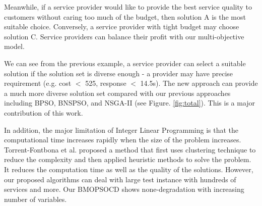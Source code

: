 \documentclass[10pt,journal,compsoc]{IEEEtran}
\begin{document}
Meanwhile, if a service provider would like to provide the best service quality to customers without caring too much of the budget, then solution A is the most suitable choice. Conversely, a service provider with tight budget may choose solution C. 
Service providers can balance their profit with our multi-objective model.

We can see from the previous example, a service provider can select a suitable solution if the solution set is diverse enough - a provider may have precise requirement (e.g. cost $<$ 525, response $<$ 14.5s). The new approach can provide a much more diverse solution set compared with our
previous approaches including BPSO, BNSPSO, and NSGA-II (see Figure. \ref{fig:total}). This is a major contribution of this work.

In addition, the major limitation of Integer Linear Programming is that the computational time increases rapidly when the size of the problem increases. Torrent-Fontbona et al. \cite{TorrentFontbona20134593} proposed a method that first uses clustering technique to reduce the complexity and then applied heuristic methods to solve the problem. It reduces the computation time as well as the quality of the solutions. However, our proposed algorithms can deal with large
test instance with hundreds of services and more. Our BMOPSOCD shows none-degradation with increasing number of variables.




\end{document}
